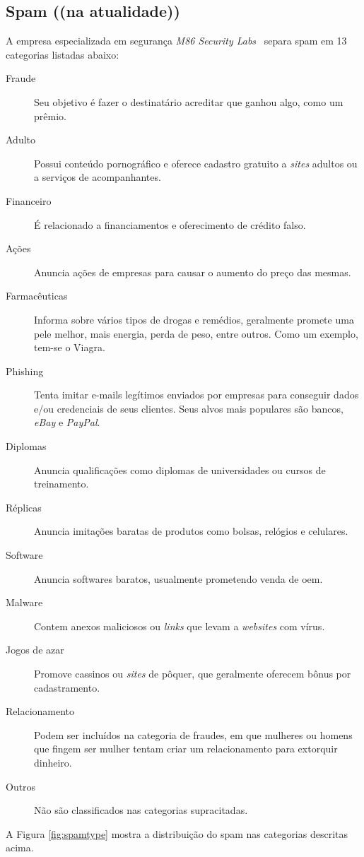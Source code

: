 \documentclass[a4paper,dvipdfm]{article}
\begin{document}
	\subsection{Spam ((na atualidade))}
		A empresa especializada em segurança \emph{M86 Security Labs}~\cite{m86} separa spam em 13 categorias listadas abaixo:
		\begin{description}
			\item [Fraude] Seu objetivo é fazer o destinatário acreditar que ganhou algo, como um prêmio.
			\item [Adulto] Possui conteúdo pornográfico e oferece cadastro gratuito a \emph{sites} adultos ou a serviços de acompanhantes.
			\item [Financeiro] É relacionado a financiamentos e oferecimento de crédito falso.
			\item [Ações] Anuncia ações de empresas para causar o aumento do preço das mesmas.
			\item [Farmacêuticas] Informa sobre vários tipos de drogas e remédios, geralmente promete uma pele melhor, mais energia, perda de peso, entre outros. 
			Como um exemplo, tem-se o Viagra.
			\item [Phishing] Tenta imitar e-mails legítimos enviados por empresas para conseguir dados e/ou credenciais de seus clientes.
			Seus alvos mais populares são bancos, \emph{eBay} e \emph{PayPal}.
			\item [Diplomas] Anuncia qualificações como diplomas de universidades ou cursos de treinamento.
			\item [Réplicas] Anuncia imitações baratas de produtos como bolsas, relógios e celulares.
			\item [Software] Anuncia softwares baratos, usualmente prometendo venda de \gls{oem}.
			\item [Malware] Contem anexos maliciosos ou \emph{links} que levam a \emph{websites} com vírus.
			\item [Jogos de azar] Promove cassinos ou \emph{sites} de pôquer, que geralmente oferecem bônus por cadastramento.
			\item [Relacionamento] Podem ser incluídos na categoria de fraudes, em que mulheres ou homens que fingem ser mulher tentam criar um relacionamento para extorquir dinheiro.
			\item [Outros] Não são classificados nas categorias supracitadas.
		\end{description}

		A Figura \ref{fig:spamtype} mostra a distribuição do spam nas categorias descritas acima.
\end{document}
